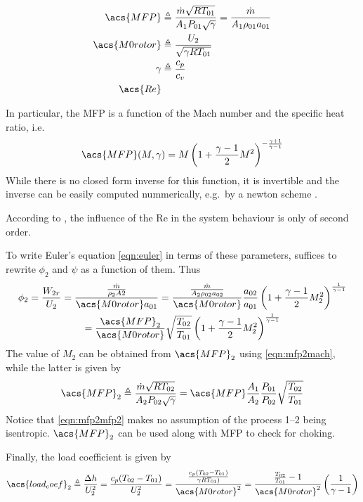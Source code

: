 \documentclass[tcc]{subfiles}
\begin{document}
\begin{align}
    \acs{MFP} &\triangleq \MFP{1} = \MFPalt{1} \\
    \acs{M0rotor} &\triangleq \frac{U_2}{\sqrt{\gamma R T_{01}}} \\
    \gamma &\triangleq \frac{c_p}{c_v} \\
    \acs{Re} &
\end{align}

In particular, the \acl{MFP} is a function of the Mach number and the specific heat ratio,
 i.e.\
\begin{equation}
    \label{eqn:mfp2mach}
    \acs{MFP}(M,\gamma) = M \left( 1 + \frac{\gamma-1}{2}M^2\right)^{-\frac{\gamma+1}{\gamma-1}}
\end{equation}
While there is no closed form inverse for this function, it is invertible and the inverse can be easily computed nummerically, e.g.\ by a newton scheme \cite{Der1974}.

According to \textcite{walsh2004gas},
 the influence of the \acl{Re} in the system behaviour is only of second order.

To write Euler's equation \cref{eqn:euler} in terms of these parameters, suffices to rewrite $\phi_2$ and $\psi$ as a function of them. Thus
\begin{multline}
    \label{eqn:phi2_dimensionless}
    \phi_2 = \frac{W_{2r}}{U_2} 
           = \frac{\frac{\dot{m}}{\rho_2 A2}}{\acs{M0rotor} a_{01}}
           = \frac{\MFPalt{2}}{\acs{M0rotor}} \frac{a_{02}}{a_{01}} \stagdensratio{2} \\ 
           = \frac{\acs{MFP}_2}{\acs{M0rotor}} \sqrt{\frac{T_{02}}{T_{01}}} \stagdensratio{2}
\end{multline}
The value of $M_2$ can be obtained from $\acs{MFP}_2$ using \cref{eqn:mfp2mach}, while the latter is given by
\begin{equation}
    \label{eqn:mfp2mfp2}
    \acs{MFP}_2 \triangleq \MFP{2} = \acs{MFP} \frac{A_1}{A_2} \frac{P_{01}}{P_{02}} \sqrt{\frac{T_{02}}{T_{01}}}
\end{equation}
Notice that \cref{eqn:mfp2mfp2} makes no assumption of the process 1--2 being isentropic. $\acs{MFP}_2$ can be used along with \acs{MFP} to check for choking.

Finally, the load coefficient is given by
\begin{equation}
    \acs{load_coef}_2 \triangleq \frac{\Delta h}{U_2^2}
                      = \frac{c_p(T_{02}-T_{01})}{U_2^2}
                      = \frac{\frac{c_p(T_{02}-T_{01})}{\gamma R T_{01})}}
                                    {\acs{M0rotor}^2}
                      = \frac{\frac{T_{02}}{T_{01}}-1}
                                  {\acs{M0rotor}^2}
                        \left(\frac{1}{\gamma-1}\right)
\end{equation}
\end{document}
